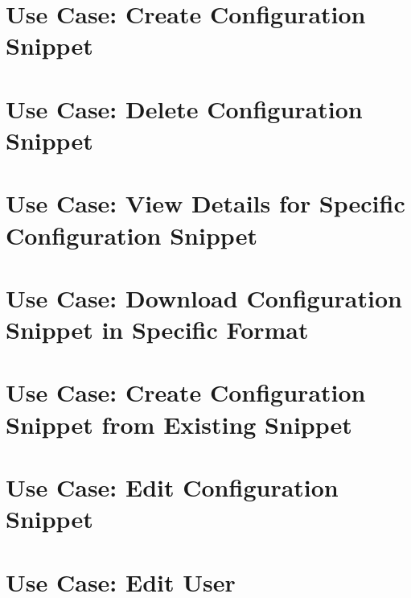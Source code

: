 \let\mypdfximage\pdfximage\def\pdfximage{\immediate\mypdfximage}\documentclass[twoside]{book}
\newcommand{\+}{\discretionary{\mbox{\scriptsize$\hookleftarrow$}}{}{}}
\begin{document}
\chapter{Use Case\+: Create Configuration Snippet}
\label{doc_usecases_snippet_sharing_UC_create_snippet_md}

\chapter{Use Case\+: Delete Configuration Snippet}
\label{doc_usecases_snippet_sharing_UC_delete_snippet_md}

\chapter{Use Case\+: View Details for Specific Configuration Snippet}
\label{doc_usecases_snippet_sharing_UC_details_snippet_md}

\chapter{Use Case\+: Download Configuration Snippet in Specific Format}
\label{doc_usecases_snippet_sharing_UC_download_snippet_md}

\chapter{Use Case\+: Create Configuration Snippet from Existing Snippet}
\label{doc_usecases_snippet_sharing_UC_duplicate_snippet_md}

\chapter{Use Case\+: Edit Configuration Snippet}
\label{doc_usecases_snippet_sharing_UC_edit_snippet_md}

\chapter{Use Case\+: Edit User}
\label{doc_usecases_snippet_sharing_UC_edit_user_md}

\end{document}
